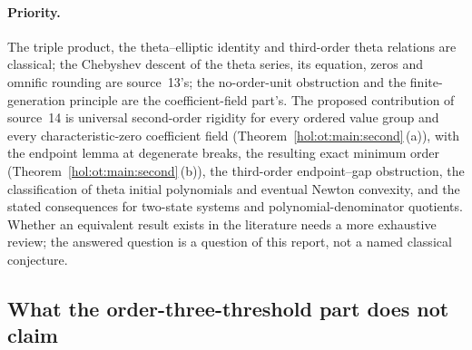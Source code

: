 \documentclass[11pt]{article}
\numberwithin{equation}{section}
\theoremstyle{definition}
\theoremstyle{remark}
\begin{document}
\paragraph{Priority.}
The triple product, the theta--elliptic identity and third-order theta
relations are classical; the Chebyshev descent of the theta series, its
equation, zeros and omnific rounding are source~13's; the no-order-unit
obstruction and the finite-generation principle are the coefficient-field
part's. The proposed contribution of source~14 is universal second-order
rigidity for every ordered value group and every characteristic-zero
coefficient field (Theorem~\ref{hol:ot:main:second}\,(a)), with the endpoint
lemma at degenerate breaks, the resulting exact minimum order
(Theorem~\ref{hol:ot:main:second}\,(b)), the third-order endpoint--gap
obstruction, the classification of theta initial polynomials and eventual
Newton convexity, and the stated consequences for two-state systems and
polynomial-denominator quotients. Whether an equivalent result exists in the
literature needs a more exhaustive review; the answered question is a
question of this report, not a named classical conjecture.

\subsection{What the order-three-threshold part does not claim}
\label{hol:ot:sub:nonclaims}
\end{document}
